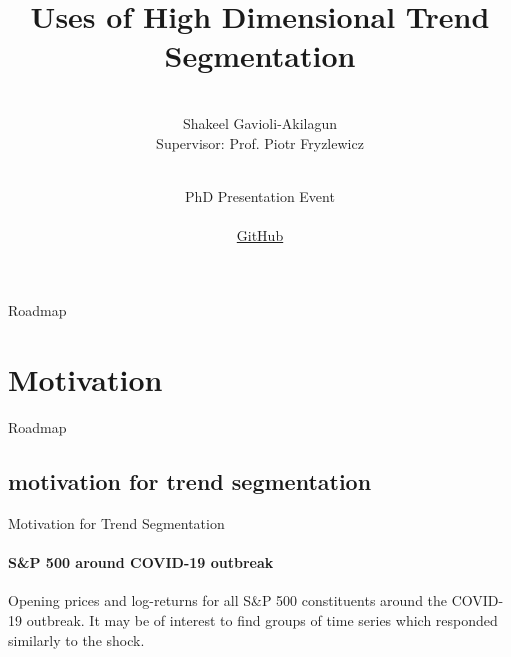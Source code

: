 \documentclass{beamer}
\title[Trend Segmentation]{Uses of High Dimensional Trend Segmentation}
\institute[LSE Department of Statistics]{}
\author[]{
\\
  {Shakeel Gavioli-Akilagun} \\
  \bigskip
  \footnotesize{Supervisor: Prof. Piotr Fryzlewicz}
}
\date[02 June 2020]{
  \hspace{1cm}\\
  PhD Presentation Event\\
  \hspace{1cm}\\
  {\fontfamily{pcr}\selectfont \href{https://github.com/Shakeel95/PhD-Presentation-1}{GitHub} }
}
\begin{document}

\begin{frame}
  \titlepage
\end{frame}




\begin{frame}{Roadmap}
  \tableofcontents
\end{frame}




\section{Motivation}




\begin{frame}{Roadmap}
\tableofcontents[currentsection]
\end{frame}



\subsection{motivation for trend segmentation}




\begin{frame}{Motivation for Trend Segmentation}
\framesubtitle{S\&P 500 around COVID-19 outbreak}

Opening prices and log-returns for all S\&P 500 constituents around the COVID-19 outbreak. It may be of interest to find groups of time series which responded similarly to the shock.

\begin{figure}[H]
    \centering
    \begin{subfigure}
        \texttt{[image: ../plots/SnP500\_raw\_COVID.png]}
    \end{subfigure}
    \begin{subfigure}
        \texttt{[image: ../plots/SnP500\_LR\_COVID.png]}
    \end{subfigure}
\end{figure}

\end{frame}
\end{document}

